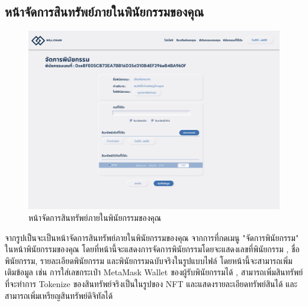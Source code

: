 \documentclass[12pt,oneside,openright,a4paper]{cpe-thai-project}
\begin{document}
\subsection{หน้าจัดการสินทรัพย์ภายในพินัยกรรมของคุณ}
		\begin{figure}[!thb]
			\centering
			\includegraphics[scale=0.2]{manageWill}
			\caption{หน้าจัดการสินทรัพย์ภายในพินัยกรรมของคุณ}
		\end{figure}
		\FloatBarrier
		\tab  จากรูปเป็นจะเป็นหน้าจัดการสินทรัพย์ภายในพินัยกรรมของคุณ จากการที่กดเมนู "จัดการพินัยกรรม" ในหน้าพินัยกรรมของคุณ โดยที่หน้านี้จะแสดงการจัดการพินัยกรรมโดยจะแสดงเลขที่พินัยกรรม , ชื่อพินัยกรรม, รายละเอียดพินัยกรรม และพินัยกรรมฉบับจริงในรูปแบบไฟล์ โดยหน้านี้จะสามารถเพิ่มเติมข้อมูล เช่น การใส่เลขกระเป๋า MetaMask Wallet ของผู้รับพินัยกรรมได้ , สามารถเพิ่มสินทรัพย์ที่จะทำการ Tokenize ของสินทรัพย์จริงเป็นในรูปของ NFT และแสดงรายละเอียดทรัพย์สินได้ และสามารถเพิ่มเหรียญสินทรัพย์ดิจิทัลได้
\end{document}

